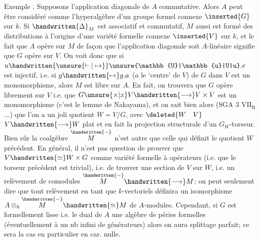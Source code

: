 Exemple . Supposons l'application diagonale de $A$ commutative. Alors $A$ peut être considéré comme l'hyperalgèbre d'un groupe formel connexe $\inserted{G}$ sur $k$. Si $\handwritten{\Delta}_{M}$ est associatif et commutatif, $M$ aussi est formé des distributions à l'origine d'une variété formelle connexe $\inserted{V}$ sur $k$, et le fait que $A$ opère sur $M$ de façon que l'application diagonale soit $A$-linéaire signifie que $G$ opère sur $V$. On voit donc que si $u\handwritten{\unsure{\vdash|\mapsto}}\unsure{\mathbb{U}|\mathbb{u}|U|u}.e$  est injectif, i.e. si $g\handwritten{\mapsto}g.a$ ($a$ le `centre' de $V$) de $G$ dans $V$ est un monomorphisme, alors $M$ est libre sur $A$. En fait, on trouvera que $G$ opère librement sur $V$ i.e.
que $G\unsure{\times|x}V\handwritten{\longrightarrow}V\times V$ est un monomorphisme (c'est le lemme de Nakayama), et on sait bien alors (SGA 3 $\mathrm{VII}_{\mathrm{B}}$ ...) que  l'on a un joli quotient $W=V/G$, avec $\deleted{W\quad V}$ $V\handwritten{\longrightarrow}W$ plat et en fait la projection structurale d'un $G_{W}$-torseur. Bien sûr la coalgèbre $\overset{\handwritten{-}}{M}$ n'est autre que celle qui définit le quotient $W$ précédent. En général, il n'est pas question de prouver que $V\handwritten{\simeq}W\times G$ comme variété formelle à opérateurs (i.e. que le torseur précédent est trivial), i.e. de trouver une section de $V$ sur $W$, i.e. un relèvement de comodules $\overset{\handwritten{-}}{M}\handwritten{\longrightarrow}M$; on peut seulement dire que tout relèvement en tant que $k$-vectoriels définira un isomorphisme $A\otimes_{k}\overset{\handwritten{-}}{M}\handwritten{\simeq}M$ de $A$-modules. Cependant, si $G$ est formellement lisse i.e. le dual de $A$ une algèbre de péries formelles (éventuellement à un nb infini de générateurs) alors on aura splittage parfait; ce sera la cas en particulier en car. nulle.

